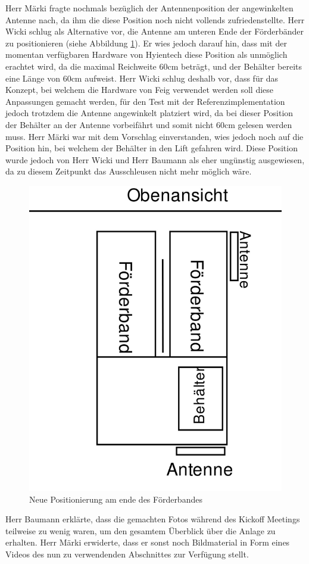 \documentclass[parskip=full, a4paper]{scrreprt}
\begin{document}
Herr Märki fragte nochmals bezüglich der Antennenposition der angewinkelten Antenne nach, da ihm die diese Position noch nicht vollends zufriedenstellte. Herr Wicki schlug als Alternative vor, die Antenne am unteren Ende der Förderbänder zu positionieren (siehe Abbildung \ref{fig:neueAntennenposition}). Er wies jedoch darauf hin, dass mit der momentan verfügbaren Hardware von Hyientech diese Position als unmöglich erachtet wird, da die maximal Reichweite 60cm beträgt, und der Behälter bereits eine Länge von 60cm aufweist. Herr Wicki schlug deshalb vor, dass für das Konzept, bei welchem die Hardware von Feig verwendet werden soll diese Anpassungen gemacht werden, für den Test mit der Referenzimplementation jedoch trotzdem die Antenne angewinkelt platziert wird, da bei dieser Position der Behälter an der Antenne vorbeifährt und somit nicht 60cm gelesen werden muss. Herr Märki war mit dem Vorschlag einverstanden, wies jedoch noch auf die Position hin, bei welchem der Behälter in den Lift gefahren wird. Diese Position wurde jedoch von Herr Wicki und Herr Baumann als eher ungünstig ausgewiesen, da zu diesem Zeitpunkt das Ausschleusen nicht mehr möglich wäre.
\begin{figure}[htb]
	\centering
	\includegraphics[keepaspectratio,width=.6\linewidth]{img/AntennenPositionNeu}
	\caption{Neue Positionierung am ende des Förderbandes}
	\label{fig:neueAntennenposition}
\end{figure}

Herr Baumann erklärte, dass die gemachten Fotos während des Kickoff Meetings teilweise zu wenig waren, um den gesamtem Überblick über die Anlage zu erhalten. Herr Märki erwiderte, dass er sonst noch Bildmaterial in Form eines Videos des nun zu verwendenden Abschnittes zur Verfügung stellt.
\end{document}
